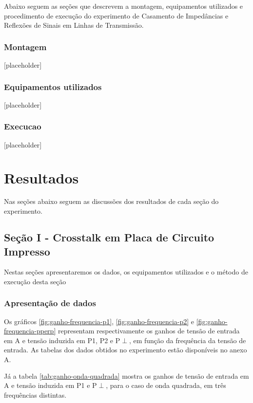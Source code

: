 \documentclass[12pt]{article}
\begin{document}
Abaixo seguem as seções que descrevem a montagem, equipamentos
utilizados e procedimento de execução do experimento de Casamento de
Impedâncias e Reflexões de Sinais em Linhas de Transmissão.

\subsubsection{Montagem}
[placeholder]

\subsubsection{Equipamentos utilizados}
[placeholder]

\subsubsection{Execucao}
[placeholder]

\section{Resultados}
Nas seções abaixo seguem as discussões dos resultados de cada seção
do experimento.

\subsection{Seção I -  Crosstalk em Placa de Circuito Impresso}
Nestas seções apresentaremos os dados, os equipamentos utilizados e o
método de execução desta seção

\subsubsection{Apresentação de dados}

Os gráficos \ref{fig:ganho-frequencia-p1}, \ref{fig:ganho-frequencia-p2} e
\ref{fig:ganho-frequencia-pperp} representam respectivamente os ganhos de
tensão de entrada em A e tensão induzida em P1, P2 e P$\perp$, em função da
frequência da tensão de entrada. As tabelas dos dados obtidos no
experimento estão disponíveis no anexo A.

Já a tabela \ref{tab:ganho-onda-quadrada} mostra os ganhos de tensão
de entrada em A e tensão induzida em P1 e P$\perp$, para o caso de
onda quadrada, em três frequências distintas.
\end{document}
